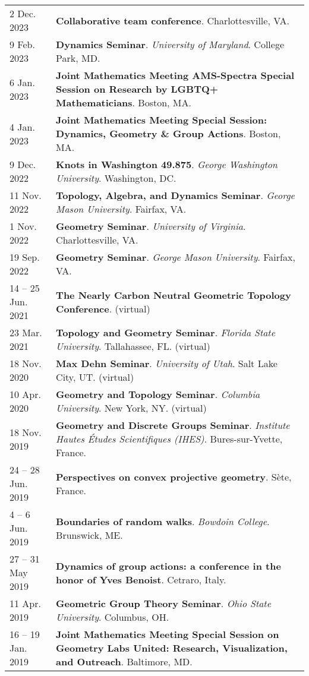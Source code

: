 \begin{center}
{\begin{longtable}{p{}  p{}}
2 Dec.  2023 & \textbf{Collaborative team conference}.  Charlottesville, VA.  \\ 
9 Feb.  2023 & \textbf{Dynamics Seminar}. \textit{University of Maryland}.  College Park, MD.  \\ 
6 Jan.  2023 & \textbf{Joint Mathematics Meeting AMS-Spectra Special Session on Research by LGBTQ+ Mathematicians}.  Boston, MA.  \\ 
4 Jan.  2023 & \textbf{Joint Mathematics Meeting Special Session: Dynamics, Geometry \& Group Actions}.  Boston, MA.  \\ 
9 Dec.  2022 & \textbf{Knots in Washington 49.875}. \textit{George Washington University}.  Washington, DC.  \\ 
11 Nov.  2022 & \textbf{Topology, Algebra, and Dynamics Seminar}. \textit{George Mason University}.  Fairfax, VA.  \\ 
1 Nov.  2022 & \textbf{Geometry Seminar}. \textit{University of Virginia}.  Charlottesville, VA.  \\ 
19 Sep.  2022 & \textbf{Geometry Seminar}. \textit{George Mason University}.  Fairfax, VA.  \\ 
14  -- 25 Jun.  2021 & \textbf{The Nearly Carbon Neutral Geometric Topology Conference}. (virtual) \\ 
23 Mar.  2021 & \textbf{Topology and Geometry Seminar}. \textit{Florida State University}.  Tallahassee, FL. (virtual) \\ 
18 Nov.  2020 & \textbf{Max Dehn Seminar}. \textit{University of Utah}.  Salt Lake City, UT. (virtual) \\ 
10 Apr.  2020 & \textbf{Geometry and Topology Seminar}. \textit{Columbia University}.  New York, NY. (virtual) \\ 
18 Nov.  2019 & \textbf{Geometry and Discrete Groups Seminar}. \textit{Institute Hautes \'Etudes Scientifiques (IHES)}.  Bures-sur-Yvette, France.  \\ 
24  -- 28 Jun.  2019 & \textbf{Perspectives on convex projective geometry}.  S\`ete, France.  \\ 
4  -- 6 Jun.  2019 & \textbf{Boundaries of random walks}. \textit{Bowdoin College}.  Brunswick, ME.  \\ 
27  -- 31 May  2019 & \textbf{Dynamics of group actions: a conference in the honor of Yves Benoist}.  Cetraro, Italy.  \\ 
11 Apr.  2019 & \textbf{Geometric Group Theory Seminar}. \textit{Ohio State University}.  Columbus, OH.  \\ 
16  -- 19 Jan.  2019 & \textbf{Joint Mathematics Meeting Special Session on Geometry Labs United: Research, Visualization, and Outreach}.  Baltimore, MD.  \\ 

\end{longtable}}
\end{center}
